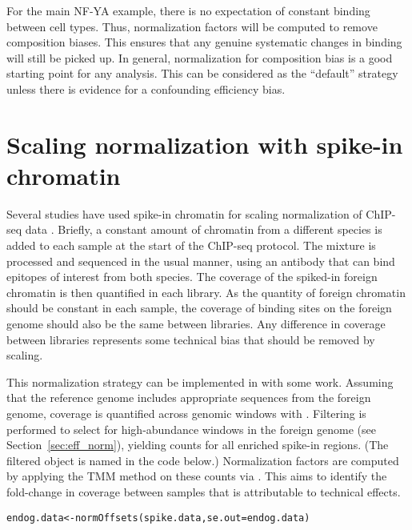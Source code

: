 \documentclass{report}\usepackage[]{graphicx}\usepackage[usenames,dvipsnames]{color}
\newcommand{\hlstd}[1]{\textcolor[rgb]{0.251,0.251,0.251}{#1}}%
\newcommand{\hlkwb}[1]{\textcolor[rgb]{0,0,0}{#1}}%
\newcommand{\hlkwc}[1]{\textcolor[rgb]{0.251,0.251,0.251}{#1}}%
\newcommand{\hlkwd}[1]{\textcolor[rgb]{0.878,0.439,0.125}{#1}}%
\newenvironment{knitrout}{}{} %
\begin{document}
For the main NF-YA example, there is no expectation of constant binding between cell types.
Thus, normalization factors will be computed to remove composition biases.
This ensures that any genuine systematic changes in binding will still be picked up.
In general, normalization for composition bias is a good starting point for any analysis.
This can be considered as the ``default'' strategy unless there is evidence for a confounding efficiency bias.

\section{Scaling normalization with spike-in chromatin}
Several studies have used spike-in chromatin for scaling normalization of ChIP-seq data \cite{bonhoure2014quantifying,orlando2014quantitative}.
Briefly, a constant amount of chromatin from a different species is added to each sample at the start of the ChIP-seq protocol.
The mixture is processed and sequenced in the usual manner, using an antibody that can bind epitopes of interest from both species.
The coverage of the spiked-in foreign chromatin is then quantified in each library.
As the quantity of foreign chromatin should be constant in each sample, the coverage of binding sites on the foreign genome should also be the same between libraries.
Any difference in coverage between libraries represents some technical bias that should be removed by scaling.

This normalization strategy can be implemented in  with some work.
Assuming that the reference genome includes appropriate sequences from the foreign genome, coverage is quantified across genomic windows with .
Filtering is performed to select for high-abundance windows in the foreign genome (see Section~\ref{sec:eff_norm}), yielding counts for all enriched spike-in regions.
(The filtered object is named  in the code below.)
Normalization factors are computed by applying the TMM method on these counts via .
This aims to identify the fold-change in coverage between samples that is attributable to technical effects.



\begin{knitrout}
\color{fgcolor}\begin{kframe}
\begin{alltt}
\hlstd{endog.data} \hlkwb{<-} \hlkwd{normOffsets}\hlstd{(spike.data,} \hlkwc{se.out}\hlstd{=endog.data)}
\end{alltt}
\end{kframe}
\end{knitrout}
\end{document}
